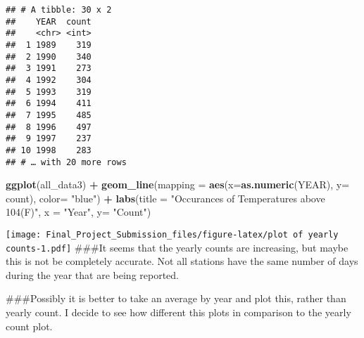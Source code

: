 \documentclass[]{article}
\newenvironment{Shaded}{\begin{snugshade}}{\end{snugshade}}
\newcommand{\DataTypeTok}[1]{\textcolor[rgb]{0.13,0.29,0.53}{#1}}
\newcommand{\DecValTok}[1]{\textcolor[rgb]{0.00,0.00,0.81}{#1}}
\newcommand{\KeywordTok}[1]{\textcolor[rgb]{0.13,0.29,0.53}{\textbf{#1}}}
\newcommand{\NormalTok}[1]{#1}
\newcommand{\OperatorTok}[1]{\textcolor[rgb]{0.81,0.36,0.00}{\textbf{#1}}}
\newcommand{\StringTok}[1]{\textcolor[rgb]{0.31,0.60,0.02}{#1}}
\begin{document}
\begin{verbatim}
## # A tibble: 30 x 2
##    YEAR  count
##    <chr> <int>
##  1 1989    319
##  2 1990    340
##  3 1991    273
##  4 1992    304
##  5 1993    319
##  6 1994    411
##  7 1995    485
##  8 1996    497
##  9 1997    237
## 10 1998    283
## # … with 20 more rows
\end{verbatim}

\begin{Shaded}
\begin{Highlighting}[]
\KeywordTok{ggplot}\NormalTok{(all_data3) }\OperatorTok{+}
\StringTok{  }\KeywordTok{geom_line}\NormalTok{(}\DataTypeTok{mapping =} \KeywordTok{aes}\NormalTok{(}\DataTypeTok{x=}\KeywordTok{as.numeric}\NormalTok{(YEAR), }\DataTypeTok{y=}\NormalTok{ count), }\DataTypeTok{color=} \StringTok{"blue"}\NormalTok{) }\OperatorTok{+}
\StringTok{  }\KeywordTok{labs}\NormalTok{(}\DataTypeTok{title =} \StringTok{"Occurances of Temperatures above 104(F)"}\NormalTok{, }\DataTypeTok{x =} \StringTok{"Year"}\NormalTok{, }\DataTypeTok{y=} \StringTok{"Count"}\NormalTok{)}
\end{Highlighting}
\end{Shaded}

\texttt{[image: Final\_Project\_Submission\_files/figure-latex/plot of yearly counts-1.pdf]}
\#\#\#It seems that the yearly counts are increasing, but maybe this is
not be completely accurate. Not all stations have the same number of
days during the year that are being reported.

\#\#\#Possibly it is better to take an average by year and plot this,
rather than yearly count. I decide to see how different this plots in
comparison to the yearly count plot.

\begin{Shaded}
\end{Shaded}
\end{document}
